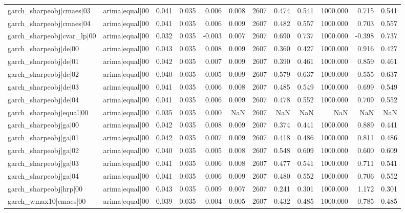 \begin{table}
\begin{tabular}{llrrrrrrrrrr}
garch\_sharpeobj|cmaes|03 & arima|equal|00 & 0.041 & 0.035 & 0.006 & 0.008 & 2607 & 0.474 & 0.541 & 1000.000 & 0.715 & 0.541 \\
garch\_sharpeobj|cmaes|04 & arima|equal|00 & 0.041 & 0.035 & 0.006 & 0.009 & 2607 & 0.482 & 0.557 & 1000.000 & 0.703 & 0.557 \\
garch\_sharpeobj|cvar\_lp|00 & arima|equal|00 & 0.032 & 0.035 & -0.003 & 0.007 & 2607 & 0.690 & 0.737 & 1000.000 & -0.398 & 0.737 \\
garch\_sharpeobj|de|00 & arima|equal|00 & 0.043 & 0.035 & 0.008 & 0.009 & 2607 & 0.360 & 0.427 & 1000.000 & 0.916 & 0.427 \\
garch\_sharpeobj|de|01 & arima|equal|00 & 0.042 & 0.035 & 0.007 & 0.009 & 2607 & 0.390 & 0.461 & 1000.000 & 0.859 & 0.461 \\
garch\_sharpeobj|de|02 & arima|equal|00 & 0.040 & 0.035 & 0.005 & 0.009 & 2607 & 0.579 & 0.637 & 1000.000 & 0.555 & 0.637 \\
garch\_sharpeobj|de|03 & arima|equal|00 & 0.041 & 0.035 & 0.006 & 0.008 & 2607 & 0.485 & 0.549 & 1000.000 & 0.699 & 0.549 \\
garch\_sharpeobj|de|04 & arima|equal|00 & 0.041 & 0.035 & 0.006 & 0.009 & 2607 & 0.478 & 0.552 & 1000.000 & 0.709 & 0.552 \\
garch\_sharpeobj|equal|00 & arima|equal|00 & 0.035 & 0.035 & 0.000 & NaN & 2607 & NaN & NaN & NaN & NaN & NaN \\
garch\_sharpeobj|ga|00 & arima|equal|00 & 0.042 & 0.035 & 0.008 & 0.009 & 2607 & 0.374 & 0.441 & 1000.000 & 0.889 & 0.441 \\
garch\_sharpeobj|ga|01 & arima|equal|00 & 0.042 & 0.035 & 0.007 & 0.009 & 2607 & 0.418 & 0.486 & 1000.000 & 0.811 & 0.486 \\
garch\_sharpeobj|ga|02 & arima|equal|00 & 0.040 & 0.035 & 0.005 & 0.008 & 2607 & 0.548 & 0.609 & 1000.000 & 0.600 & 0.609 \\
garch\_sharpeobj|ga|03 & arima|equal|00 & 0.041 & 0.035 & 0.006 & 0.008 & 2607 & 0.477 & 0.541 & 1000.000 & 0.711 & 0.541 \\
garch\_sharpeobj|ga|04 & arima|equal|00 & 0.041 & 0.035 & 0.006 & 0.009 & 2607 & 0.480 & 0.552 & 1000.000 & 0.706 & 0.552 \\
garch\_sharpeobj|hrp|00 & arima|equal|00 & 0.043 & 0.035 & 0.009 & 0.007 & 2607 & 0.241 & 0.301 & 1000.000 & 1.172 & 0.301 \\
garch\_wmax10|cmaes|00 & arima|equal|00 & 0.039 & 0.035 & 0.004 & 0.005 & 2607 & 0.432 & 0.485 & 1000.000 & 0.785 & 0.485 \\

\end{tabular}
\end{table}
